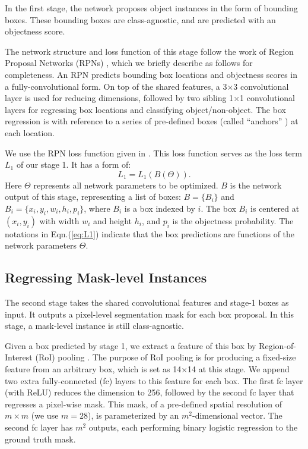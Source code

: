 \documentclass[10pt,twocolumn,letterpaper]{article}
\begin{document}
In the first stage, the network proposes object instances in the form of bounding boxes. These bounding boxes are class-agnostic, and are predicted with an objectness score.

The network structure and loss function of this stage follow the work of Region Proposal Networks (RPNs) \cite{Ren2015}, which we briefly describe as follows for completeness. An RPN predicts bounding box locations and objectness scores in a fully-convolutional form. On top of the shared features, a 3$\times$3 convolutional layer is used for reducing dimensions, followed by two sibling 1$\times$1 convolutional layers for regressing box locations and classifying object/non-object. The box regression is with reference to a series of pre-defined boxes (called ``anchors'' \cite{Ren2015}) at each location.

We use the RPN loss function given in \cite{Ren2015}. This loss function serves as the loss term $L_1$ of our stage 1.
It has a form of:
\begin{equation}\label{eq:L1}
L_1 = L_1(B(\Theta)).
\end{equation}
Here $\Theta$ represents all network parameters to be optimized. $B$ is the network output of this stage, representing a list of boxes: $B=\{B_i\}$ and $B_i=\{x_i, y_i, w_i, h_i, p_i\}$, where $B_i$ is a box indexed by $i$. The box $B_i$ is centered at $(x_i, y_i)$ with width $w_i$ and height $h_i$, and $p_i$ is the objectness probability.
The notations in Eqn.(\ref{eq:L1}) indicate that the box predictions are functions of the network parameters $\Theta$.

\subsection{Regressing Mask-level Instances}

The second stage takes the shared convolutional features and stage-1 boxes as input. It outputs a pixel-level segmentation mask for each box proposal. In this stage, a mask-level instance is still class-agnostic.

Given a box predicted by stage 1, we extract a feature of this box by Region-of-Interest (RoI) pooling \cite{He2014,Girshick2015}.
The purpose of RoI pooling is for producing a fixed-size feature from an arbitrary box, which is set as 14$\times$14 at this stage.
We append two extra fully-connected (fc) layers to this feature for each box. The first fc layer (with ReLU) reduces the dimension to 256, followed by the second fc layer that regresses a pixel-wise mask. This mask, of a pre-defined spatial resolution of $m\times m$ (we use $m=28$), is parameterized by an $m^2$-dimensional vector. The second fc layer has $m^2$ outputs, each performing binary logistic regression to the ground truth mask.
\end{document}
